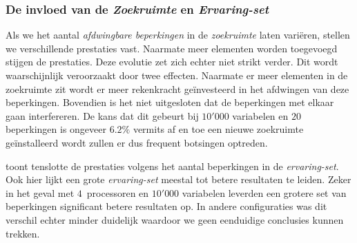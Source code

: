 \subsubsection{De invloed van de \emph{Zoekruimte} en \emph{Ervaring-set}}


Als we het aantal \emph{afdwingbare beperkingen} in de \emph{zoekruimte} laten vari\"eren, stellen we verschillende prestaties vast. Naarmate meer elementen worden toegevoegd stijgen de prestaties. Deze evolutie zet zich echter niet strikt verder. Dit wordt waarschijnlijk veroorzaakt door twee effecten. Naarmate er meer elementen in de zoekruimte zit wordt er meer rekenkracht ge\"investeerd in het afdwingen van deze beperkingen. Bovendien is het niet uitgesloten dat de beperkingen met elkaar gaan interfereren. De kans dat dit gebeurt bij $10'000$ variabelen en $20$ beperkingen is ongeveer $6.2\%$ vermits af en toe een nieuwe zoekruimte ge\"installeerd wordt zullen er dus frequent botsingen optreden.


 toont tenslotte de prestaties volgens het aantal beperkingen in de \emph{ervaring-set}. Ook hier lijkt een grote \emph{ervaring-set} meestal tot betere resultaten te leiden. Zeker in het geval met $4$~processoren en $10'000$ variabelen leverden een grotere set van beperkingen significant betere resultaten op. In andere configuraties was dit verschil echter minder duidelijk waardoor we geen eenduidige conclusies kunnen trekken.